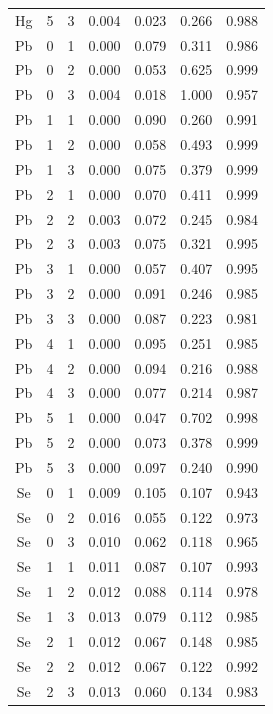 \documentclass[ms, hidelinks]{uncgdissertationexp3}
\theoremstyle{plain}
\theoremstyle{definition}
\theoremstyle{remark}
\begin{document}
\begin{longtable}{ccccccc}
  Hg & 5 & 3 & 0.004 & 0.023 & 0.266 & 0.988\\
  \rowcolor{gray!6}  Pb & 0 & 1 & 0.000 & 0.079 & 0.311 & 0.986\\
  Pb & 0 & 2 & 0.000 & 0.053 & 0.625 & 0.999\\
  \rowcolor{gray!6}  Pb & 0 & 3 & 0.004 & 0.018 & 1.000 & 0.957\\
  Pb & 1 & 1 & 0.000 & 0.090 & 0.260 & 0.991\\
  \rowcolor{gray!6}  Pb & 1 & 2 & 0.000 & 0.058 & 0.493 & 0.999\\
  Pb & 1 & 3 & 0.000 & 0.075 & 0.379 & 0.999\\
  \rowcolor{gray!6}  Pb & 2 & 1 & 0.000 & 0.070 & 0.411 & 0.999\\
  Pb & 2 & 2 & 0.003 & 0.072 & 0.245 & 0.984\\
  \rowcolor{gray!6}  Pb & 2 & 3 & 0.003 & 0.075 & 0.321 & 0.995\\
  Pb & 3 & 1 & 0.000 & 0.057 & 0.407 & 0.995\\
  \rowcolor{gray!6}  Pb & 3 & 2 & 0.000 & 0.091 & 0.246 & 0.985\\
  Pb & 3 & 3 & 0.000 & 0.087 & 0.223 & 0.981\\
  \rowcolor{gray!6}  Pb & 4 & 1 & 0.000 & 0.095 & 0.251 & 0.985\\
  Pb & 4 & 2 & 0.000 & 0.094 & 0.216 & 0.988\\
  \rowcolor{gray!6}  Pb & 4 & 3 & 0.000 & 0.077 & 0.214 & 0.987\\
  Pb & 5 & 1 & 0.000 & 0.047 & 0.702 & 0.998\\
  \rowcolor{gray!6}  Pb & 5 & 2 & 0.000 & 0.073 & 0.378 & 0.999\\
  Pb & 5 & 3 & 0.000 & 0.097 & 0.240 & 0.990\\
  \rowcolor{gray!6}  Se & 0 & 1 & 0.009 & 0.105 & 0.107 & 0.943\\
  Se & 0 & 2 & 0.016 & 0.055 & 0.122 & 0.973\\
  \rowcolor{gray!6}  Se & 0 & 3 & 0.010 & 0.062 & 0.118 & 0.965\\
  Se & 1 & 1 & 0.011 & 0.087 & 0.107 & 0.993\\
  \rowcolor{gray!6}  Se & 1 & 2 & 0.012 & 0.088 & 0.114 & 0.978\\
  Se & 1 & 3 & 0.013 & 0.079 & 0.112 & 0.985\\
  \rowcolor{gray!6}  Se & 2 & 1 & 0.012 & 0.067 & 0.148 & 0.985\\
  Se & 2 & 2 & 0.012 & 0.067 & 0.122 & 0.992\\
  \rowcolor{gray!6}  Se & 2 & 3 & 0.013 & 0.060 & 0.134 & 0.983\\

\end{longtable}
\end{document}
